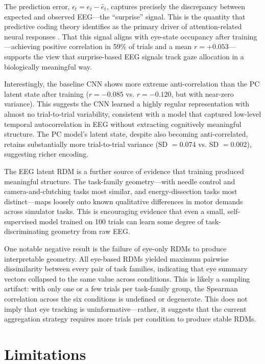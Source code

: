 \documentclass[11pt, letterpaper]{article}
\begin{document}
The prediction error, $\epsilon_t = e_t - \hat{e}_t$, captures precisely the
discrepancy between expected and observed EEG---the ``surprise'' signal. This is the
quantity that predictive coding theory identifies as the primary driver of
attention-related neural responses \citep{whittington2019theories}. That this signal
aligns with eye-state occupancy after training---achieving positive correlation in 59\%
of trials and a mean $r = +0.053$---supports the view that surprise-based EEG signals
track gaze allocation in a biologically meaningful way.

Interestingly, the baseline CNN shows more extreme anti-correlation than the PC latent
state after training ($r = -0.085$ vs. $r = -0.120$, but with near-zero variance). This
suggests the CNN learned a highly regular representation with almost no trial-to-trial
variability, consistent with a model that captured low-level temporal autocorrelation in
EEG without extracting cognitively meaningful structure. The PC model's latent state,
despite also becoming anti-correlated, retains substantially more trial-to-trial variance
(SD $= 0.074$ vs. SD $= 0.002$), suggesting richer encoding.

The EEG latent RDM is a further source of evidence that training produced meaningful
structure. The task-family geometry---with needle control and camera-and-clutching tasks
most similar, and energy-dissection tasks most distinct---maps loosely onto known
qualitative differences in motor demands across simulator tasks. This is encouraging
evidence that even a small, self-supervised model trained on 100 trials can learn some
degree of task-discriminating geometry from raw EEG.

One notable negative result is the failure of eye-only RDMs to produce interpretable
geometry. All eye-based RDMs yielded maximum pairwise dissimilarity between every pair
of task families, indicating that eye summary vectors collapsed to the same value across
conditions. This is likely a sampling artifact: with only one or a few trials per
task-family group, the Spearman correlation across the six conditions is undefined or
degenerate. This does not imply that eye tracking is uninformative---rather, it
suggests that the current aggregation strategy requires more trials per condition to
produce stable RDMs.

\section{Limitations}
\end{document}

